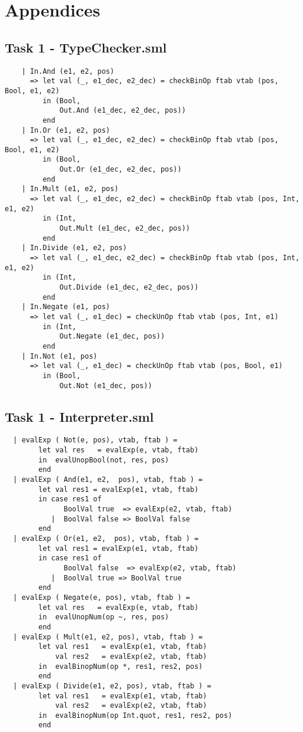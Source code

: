 \documentclass{article}
\begin{document}
\section{Appendices}

\subsection{Task 1 - TypeChecker.sml}\label{app:1type}

\begin{lstlisting}
    | In.And (e1, e2, pos)
      => let val (_, e1_dec, e2_dec) = checkBinOp ftab vtab (pos, Bool, e1, e2)
         in (Bool,
             Out.And (e1_dec, e2_dec, pos))
         end
    | In.Or (e1, e2, pos)
      => let val (_, e1_dec, e2_dec) = checkBinOp ftab vtab (pos, Bool, e1, e2)
         in (Bool,
             Out.Or (e1_dec, e2_dec, pos))
         end
    | In.Mult (e1, e2, pos)
      => let val (_, e1_dec, e2_dec) = checkBinOp ftab vtab (pos, Int, e1, e2)
         in (Int,
             Out.Mult (e1_dec, e2_dec, pos))
         end
    | In.Divide (e1, e2, pos)
      => let val (_, e1_dec, e2_dec) = checkBinOp ftab vtab (pos, Int, e1, e2)
         in (Int,
             Out.Divide (e1_dec, e2_dec, pos))
         end
    | In.Negate (e1, pos)
      => let val (_, e1_dec) = checkUnOp ftab vtab (pos, Int, e1)
         in (Int,
             Out.Negate (e1_dec, pos))
         end
    | In.Not (e1, pos)
      => let val (_, e1_dec) = checkUnOp ftab vtab (pos, Bool, e1)
         in (Bool,
             Out.Not (e1_dec, pos))
\end{lstlisting}

\subsection{Task 1 - Interpreter.sml}\label{app:1inter}
\begin{lstlisting}
  | evalExp ( Not(e, pos), vtab, ftab ) =
        let val res   = evalExp(e, vtab, ftab)
        in  evalUnopBool(not, res, pos)
        end
  | evalExp ( And(e1, e2,  pos), vtab, ftab ) =
        let val res1 = evalExp(e1, vtab, ftab)
        in case res1 of
              BoolVal true  => evalExp(e2, vtab, ftab)
           |  BoolVal false => BoolVal false
        end
  | evalExp ( Or(e1, e2,  pos), vtab, ftab ) =
        let val res1 = evalExp(e1, vtab, ftab)
        in case res1 of
              BoolVal false  => evalExp(e2, vtab, ftab)
           |  BoolVal true => BoolVal true
        end
  | evalExp ( Negate(e, pos), vtab, ftab ) =
        let val res   = evalExp(e, vtab, ftab)
        in  evalUnopNum(op ~, res, pos)
        end
  | evalExp ( Mult(e1, e2, pos), vtab, ftab ) =
        let val res1   = evalExp(e1, vtab, ftab)
            val res2   = evalExp(e2, vtab, ftab)
        in  evalBinopNum(op *, res1, res2, pos)
        end
  | evalExp ( Divide(e1, e2, pos), vtab, ftab ) =
        let val res1   = evalExp(e1, vtab, ftab)
            val res2   = evalExp(e2, vtab, ftab)
        in  evalBinopNum(op Int.quot, res1, res2, pos)
        end
\end{lstlisting}
\end{document}
